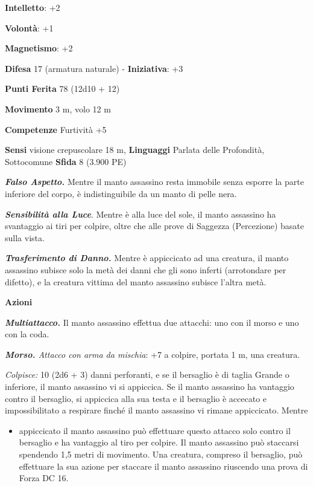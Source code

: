 \begin{multicols}{2}
\textbf{Intelletto}: +2

\textbf{Volontà}: +1

\textbf{Magnetismo}: +2

\textbf{Difesa} 17 (armatura naturale) - \textbf{Iniziativa}: +3

\textbf{Punti Ferita} 78 (12d10 + 12)

\textbf{Movimento} 3 m, volo 12 m

\textbf{Competenze} Furtività +5

\textbf{Sensi} visione crepuscolare 18 m, 
\textbf{Linguaggi} Parlata delle Profondità, Sottocomune \textbf{Sfida}
8 (3.900 PE)\smallskip

\emph{\textbf{Falso Aspetto.}} Mentre il manto assassino resta immobile
senza esporre la parte inferiore del corpo, è indistinguibile da un
manto di pelle nera.

\emph{\textbf{Sensibilità alla Luce}}. Mentre è alla luce del sole, il
manto assassino ha svantaggio ai tiri per colpire, oltre che alle prove
di Saggezza (Percezione) basate sulla vista.

\emph{\textbf{Trasferimento di Danno.}} Mentre è appiccicato ad una
creatura, il manto assassino subisce solo la metà dei danni che gli sono
inferti (arrotondare per difetto), e la creatura vittima del manto
assassino subisce l'altra metà.

\smallskip\textbf{Azioni}

\emph{\textbf{Multiattacco.}} Il manto assassino effettua due attacchi:
uno con il morso e uno con la coda.

\emph{\textbf{Morso.} Attacco con arma da mischia}: +7 a colpire,
portata 1 m, una creatura.

\emph{Colpisce:} 10 (2d6 + 3) danni perforanti, e se il bersaglio è di
taglia Grande o inferiore, il manto assassino vi si appiccica. Se il
manto assassino ha vantaggio contro il bersaglio, si appiccica alla sua
testa e il bersaglio è accecato e impossibilitato a respirare finché il
manto assassino vi rimane appiccicato. Mentre


\begin{itemize}
\item
  appiccicato il manto assassino può effettuare questo attacco solo
  contro il bersaglio e ha vantaggio al tiro per colpire. Il manto
  assassino può staccarsi spendendo 1,5 metri di movimento. Una
  creatura, compreso il bersaglio, può effettuare la sua azione per
  staccare il manto assassino riuscendo una prova di Forza DC 16.
\end{itemize}



\end{multicols}

